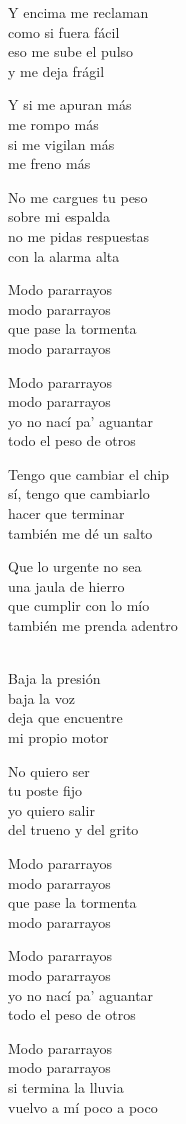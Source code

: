 \begin{lyrics}
Y encima me reclaman\\
como si fuera fácil\\
eso me sube el pulso\\
y me deja frágil

Y si me apuran más\\
me rompo más\\
si me vigilan más\\
me freno más

No me cargues tu peso\\
sobre mi espalda\\
no me pidas respuestas\\
con la alarma alta

Modo pararrayos\\
modo pararrayos\\
que pase la tormenta\\
modo pararrayos

Modo pararrayos\\
modo pararrayos\\
yo no nací pa' aguantar\\
todo el peso de otros

Tengo que cambiar el chip\\
sí, tengo que cambiarlo\\
hacer que terminar\\
también me dé un salto

Que lo urgente no sea\\
una jaula de hierro\\
que cumplir con lo mío\\
también me prenda adentro

\\
Baja la presión\\
baja la voz\\
deja que encuentre\\
mi propio motor

No quiero ser\\
tu poste fijo\\
yo quiero salir\\
del trueno y del grito

Modo pararrayos\\
modo pararrayos\\
que pase la tormenta\\
modo pararrayos

Modo pararrayos\\
modo pararrayos\\
yo no nací pa' aguantar\\
todo el peso de otros

Modo pararrayos\\
modo pararrayos\\
si termina la lluvia\\
vuelvo a mí poco a poco

\end{lyrics}

